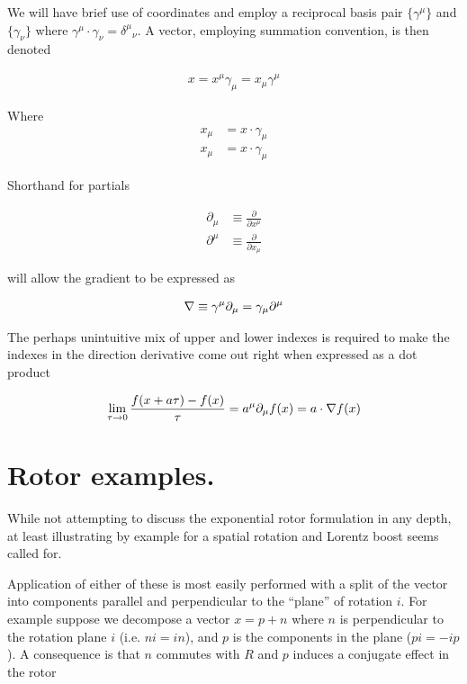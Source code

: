 We will have brief use of coordinates and employ a reciprocal basis pair $\{\gamma^\mu\}$ and $\{\gamma_\nu\}$ where $\gamma^\mu \cdot \gamma_\nu = {\delta^{\mu}}_\nu$.  A vector, employing summation convention, is then denoted

\begin{align}\label{eqn:rotationGen:foo5}
x = x^\mu \gamma_\mu = x_\mu \gamma^\mu
\end{align}

Where
\begin{align}\label{eqn:rotationGen:foo6}
x_\mu &= x \cdot \gamma_\mu \\
x_\mu &= x \cdot \gamma_\mu
\end{align}

Shorthand for partials

\begin{align}\label{eqn:rotationGen:foo7}
\partial_\mu &\equiv \frac{\partial}{\partial x^\mu} \\
\partial^\mu &\equiv \frac{\partial}{\partial x_\mu}
\end{align}

will allow the gradient to be expressed as 

\begin{align}\label{eqn:rotationGen:foo8}
\nabla \equiv \gamma^\mu \partial_\mu = \gamma_\mu \partial^\mu
\end{align}

The perhaps unintuitive mix of upper and lower indexes is required to make the indexes in the direction derivative come out right when expressed as a dot product

\begin{align}\label{eqn:rotationGen:foo9}
\lim_{\tau \rightarrow 0} \frac{f(x + a\tau) - f(x)}{\tau} = a^\mu \partial_\mu f(x) = a \cdot \nabla f(x)
\end{align}

\section{Rotor examples.}

While not attempting to discuss the exponential rotor formulation in any depth, at least illustrating by example for a spatial rotation and Lorentz boost seems called for.

Application of either of these is most easily performed with a split of the vector into components parallel and perpendicular to the ``plane'' of rotation $i$.  For example suppose we decompose a vector $x = p + n$ where $n$ is perpendicular to the rotation plane $i$ (i.e. $n i = i n$), and $p$ is the components in the plane ($p i = - i p$).  A consequence is that $n$ commutes with $R$ and $p$ induces a conjugate effect in the rotor

